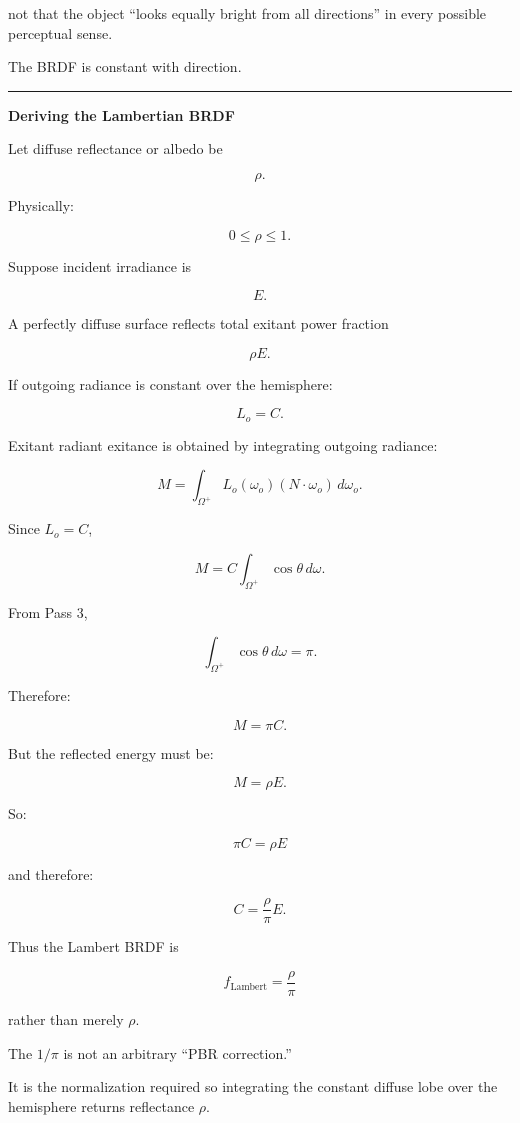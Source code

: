 not that the object ``looks equally bright from all directions'' in every possible perceptual sense.

The BRDF is constant with direction.

\begin{center}\rule{0.5\linewidth}{0.5pt}\end{center}

\textbf{Deriving the Lambertian BRDF}

Let diffuse reflectance or albedo be

\[
\rho.
\]

Physically:

\[
0\le\rho\le1.
\]

Suppose incident irradiance is

\[
E.
\]

A perfectly diffuse surface reflects total exitant power fraction

\[
\rho E.
\]

If outgoing radiance is constant over the hemisphere:

\[
L_o=C.
\]

Exitant radiant exitance is obtained by integrating outgoing radiance:

\[
M=
\int_{\Omega^+}
L_o(\omega_o)
(N\cdot\omega_o)
\,d\omega_o.
\]

Since \(L_o=C\),

\[
M=
C
\int_{\Omega^+}
\cos\theta\,d\omega.
\]

From Pass 3,

\[
\int_{\Omega^+}
\cos\theta\,d\omega
=
\pi.
\]

Therefore:

\[
M=\pi C.
\]

But the reflected energy must be:

\[
M=\rho E.
\]

So:

\[
\pi C=\rho E
\]

and therefore:

\[
C=\frac{\rho}{\pi}E.
\]

Thus the Lambert BRDF is

\[
\boxed{
f_{\text{Lambert}}
=
\frac{\rho}{\pi}
}
\]

rather than merely \(\rho\).

The \(1/\pi\) is not an arbitrary ``PBR correction.''

It is the normalization required so integrating the constant diffuse lobe over the hemisphere returns reflectance \(\rho\).

